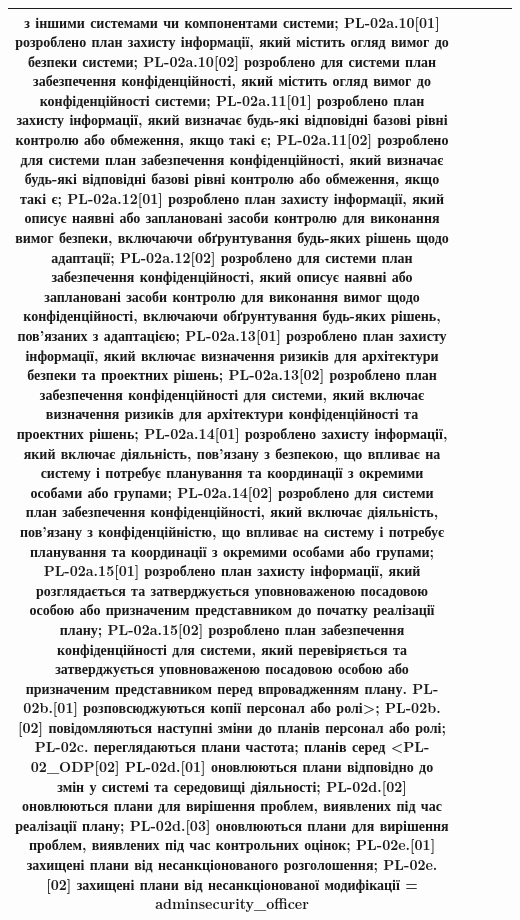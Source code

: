 \documentclass[10pt]{article}
\begin{document}
\begin{longtable}{|c|>{\raggedright\arraybackslash}p{2.5cm}|>{\raggedright\arraybackslash}p{4.5cm}|>{\raggedright\arraybackslash}p{3cm}|>{\raggedright\arraybackslash}p{4.5cm}|}
з іншими системами чи компонентами системи; PL-02a.10[01] розроблено план захисту інформації, який містить огляд вимог до безпеки системи; PL-02a.10[02] розроблено для системи план забезпечення конфіденційності, який містить огляд вимог до конфіденційності системи; PL-02a.11[01] розроблено план захисту інформації, який визначає будь-які відповідні базові рівні контролю або обмеження, якщо такі є; PL-02a.11[02] розроблено для системи план забезпечення конфіденційності, який визначає будь-які відповідні базові рівні контролю або обмеження, якщо такі є; PL-02a.12[01] розроблено план захисту інформації, який описує наявні або заплановані засоби контролю для виконання вимог безпеки, включаючи обґрунтування будь-яких рішень щодо адаптації; PL-02a.12[02] розроблено для системи план забезпечення конфіденційності, який описує наявні або заплановані засоби контролю для виконання вимог щодо конфіденційності, включаючи обґрунтування будь-яких рішень, пов'язаних з адаптацією; PL-02a.13[01] розроблено план захисту інформації, який включає визначення ризиків для архітектури безпеки та проектних рішень; PL-02a.13[02] розроблено план забезпечення конфіденційності для системи, який включає визначення ризиків для архітектури конфіденційності та проектних рішень; PL-02a.14[01] розроблено захисту інформації, який включає діяльність, пов'язану з безпекою, що впливає на систему і потребує планування та координації з окремими особами або групами; PL-02a.14[02] розроблено для системи план забезпечення конфіденційності, який включає діяльність, пов'язану з конфіденційністю, що впливає на систему і потребує планування та координації з окремими особами або групами; PL-02a.15[01] розроблено план захисту інформації, який розглядається та затверджується уповноваженою посадовою особою або призначеним представником до початку реалізації плану; PL-02a.15[02] розроблено план забезпечення конфіденційності для системи, який перевіряється та затверджується уповноваженою посадовою особою або призначеним представником перед впровадженням плану. PL-02b.[01] розповсюджуються копії персонал або ролі>; PL-02b.[02] повідомляються наступні зміни до планів персонал або ролі; PL-02c. переглядаються плани частота; планів серед <PL-02\_\allowbreak{}ODP[02] PL-02d.[01] оновлюються плани відповідно до змін у системі та середовищі діяльності; PL-02d.[02] оновлюються плани для вирішення проблем, виявлених під час реалізації плану; PL-02d.[03] оновлюються плани для вирішення проблем, виявлених під час контрольних оцінок; PL-02e.[01] захищені плани від несанкціонованого розголошення; PL-02e.[02] захищені плани від несанкціонованої модифікації = \textbf{adminsecurity\_\allowbreak{}officer} \\ \hline

\end{longtable}
\end{document}

